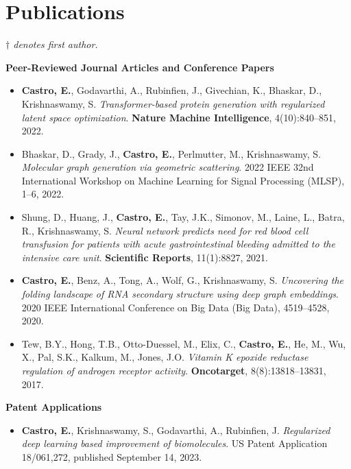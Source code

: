 \documentclass[letterpaper,11pt]{article}
\begin{document}
\section{Publications}
{\small \textit{$\dagger$ denotes first author.}}
\vspace{4pt}

{\small
\textbf{Peer-Reviewed Journal Articles and Conference Papers}
\begin{itemize}[leftmargin=0.18in, itemsep=5pt, topsep=2pt]
  \item[$\dagger$] \textbf{Castro, E.}, Godavarthi, A., Rubinfien, J., Givechian, K., Bhaskar, D., Krishnaswamy, S.
  \textit{Transformer-based protein generation with regularized latent space optimization}.
  \textbf{Nature Machine Intelligence}, 4(10):840--851, 2022.

  \item Bhaskar, D., Grady, J., \textbf{Castro, E.}, Perlmutter, M., Krishnaswamy, S.
  \textit{Molecular graph generation via geometric scattering}.
  2022 IEEE 32nd International Workshop on Machine Learning for Signal Processing (MLSP), 1--6, 2022.

  \item Shung, D., Huang, J., \textbf{Castro, E.}, Tay, J.K., Simonov, M., Laine, L., Batra, R., Krishnaswamy, S.
  \textit{Neural network predicts need for red blood cell transfusion for patients with acute gastrointestinal bleeding admitted to the intensive care unit}.
  \textbf{Scientific Reports}, 11(1):8827, 2021.

  \item[$\dagger$] \textbf{Castro, E.}, Benz, A., Tong, A., Wolf, G., Krishnaswamy, S.
  \textit{Uncovering the folding landscape of RNA secondary structure using deep graph embeddings}.
  2020 IEEE International Conference on Big Data (Big Data), 4519--4528, 2020.

  \item Tew, B.Y., Hong, T.B., Otto-Duessel, M., Elix, C., \textbf{Castro, E.}, He, M., Wu, X., Pal, S.K., Kalkum, M., Jones, J.O.
  \textit{Vitamin K epoxide reductase regulation of androgen receptor activity}.
  \textbf{Oncotarget}, 8(8):13818--13831, 2017.
\end{itemize}

\vspace{4pt}
\textbf{Patent Applications}
\begin{itemize}[leftmargin=0.18in, itemsep=5pt, topsep=2pt]
  \item[$\dagger$] \textbf{Castro, E.}, Krishnaswamy, S., Godavarthi, A., Rubinfien, J.
  \textit{Regularized deep learning based improvement of biomolecules}.
  US Patent Application 18/061,272, published September 14, 2023.
\end{itemize}

}
\end{document}
